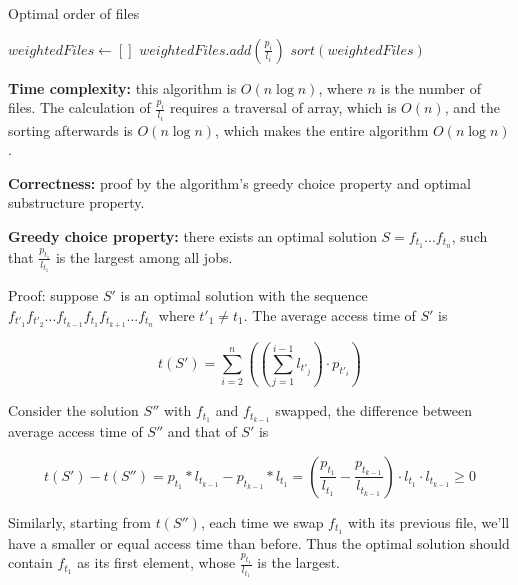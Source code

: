 \documentclass{article}
\begin{document}
\begin{description}
  \begin{algorithm}[h]
  \caption{Optimal order of files}
  \label{alg:optimal-order-of-files}
    \begin{algorithmic}[1]
  
      \State $weightedFiles \gets []$
        \State $weightedFiles.add(\frac{p_i}{l_i})$
      \EndFor
      \State \Return $sort(weightedFiles)$
    \EndFunction
    
    \end{algorithmic}
  \end{algorithm}

  \textbf{Time complexity:} this algorithm is $O(n \log n)$, where $n$ is the number of files. The calculation of $\frac{p_i}{l_i}$ requires a traversal of array, which is $O(n)$, and the sorting afterwards is $O(n \log n)$, which makes the entire algorithm $O(n \log n)$.

  \textbf{Correctness:} proof by the algorithm's greedy choice property and optimal substructure property.

  \textbf{Greedy choice property:} there exists an optimal solution $S=f_{t_1}...f_{t_n}$, such that $\frac{p_{t_1}}{l_{t_1}}$ is the largest among all jobs.

  Proof: suppose $S'$ is an optimal solution with the sequence $f_{t'_1}f_{t'_2}...f_{t_{k-1}}f_{t_1}f_{t_{k+1}}...f_{t_n}$ where $t'_1 \neq t_1$. The average access time of $S'$ is 

  $$t(S') = \sum_{i=2}^{n}{((\sum_{j=1}^{i-1}{l_{t'_j}}) \cdot p_{t'_i})}$$

  Consider the solution $S''$ with $f_{t_1}$ and $f_{t_{k-1}}$ swapped, the difference between average access time of $S''$ and that of $S'$ is

  $$t(S') - t(S'') = p_{t_{1}} * l_{t_{k-1}} - p_{t_{k-1}} * l_{t_1} = (\frac{p_{t_1}}{l_{t_1}} - \frac{p_{t_{k-1}}}{l_{t_{k-1}}}) \cdot l_{t_1} \cdot l_{t_{k-1}} \geq 0$$

  Similarly, starting from $t(S'')$, each time we swap $f_{t_1}$ with its previous file, we'll have a smaller or equal access time than before. Thus the optimal solution should contain $f_{t_1}$ as its first element, whose $\frac{p_{t_1}}{l_{t_1}}$ is the largest.


\end{description}
\end{document}
